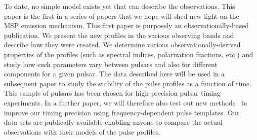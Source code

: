 \documentclass[useAMS,usenatbib]{mn2e}
\begin{document}
To date, no simple model exists yet that can describe the observations.  
%
This paper is the first in a series of papers that we hope will shed new light on 
the MSP emission mechanism. This first paper is purposely an observationally-based 
publication.  
%
We present the new profiles in the various observing bands and describe how they were 
created. We determine various observationally-derived properties of the profiles (such as 
spectral indices, polarization fractions, etc.) and study how such parameters vary 
between pulsars and also for different components for a given pulsar.   
%
The data described here will be used in a subsequent paper to study the stability 
of the pulse profiles as a function of time. This sample of pulsars has been chosen for 
high-precision pulsar timing experiments. In a further paper, we will therefore also test 
out new methods~\citep[e.g.,][]{Pennucci14,Liu14} to improve our timing precision using 
frequency-dependent pulse templates.  
%
Our data sets are publically available enabling anyone to compare the actual 
observations with their models of the pulse profiles.
%

%
%
%
\end{document}
